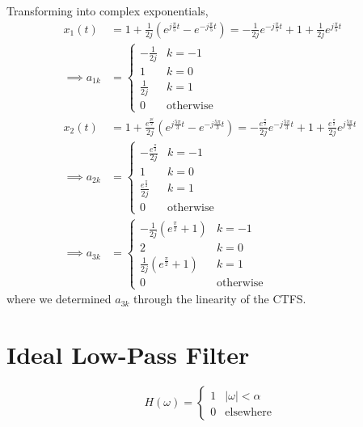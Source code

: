 \documentclass{article}
\begin{document}
Transforming into complex exponentials,
\begin{align}
    x_1(t) &= 1 + \frac{1}{2j} (e^{j\frac{\pi}{5} t} - e^{-j\frac{\pi}{5} t}) = -\frac{1}{2j} e^{-j \frac{\pi}{5} t} + 1 + \frac{1}{2j} e^{j \frac{\pi}{5} t} \\
    \implies a_{1k} &=
    \begin{cases}
        -\frac{1}{2j} & k = -1 \\
        1 & k = 0 \\
        \frac{1}{2j} & k = 1 \\
        0 & \text{otherwise}
    \end{cases} \\
    x_2(t) &= 1 + \frac{e^{\frac{pi}{2}}}{2j} (e^{j \frac{5 \pi}{3} t} - e^{-j \frac{5 \pi}{3} t}) = -\frac{e^{\frac{\pi}{2}}}{2j} e^{-j \frac{5 \pi}{3} t} + 1 + \frac{e^{\frac{\pi}{2}}}{2j} e^{j \frac{5 \pi}{3} t} \\
    \implies a_{2k} &=
    \begin{cases}
        -\frac{e^{\frac{\pi}{2}}}{2j} & k = -1 \\
        1 & k = 0 \\
        \frac{e^{\frac{\pi}{2}}}{2j} & k = 1 \\
        0 & \text{otherwise}
    \end{cases} \\
    \implies a_{3k} &=
    \begin{cases}
        -\frac{1}{2j} (e^{\frac{\pi}{2}} + 1) & k = -1 \\
        2 & k = 0 \\
        \frac{1}{2j} (e^{\frac{\pi}{2}} + 1) & k = 1 \\
        0 & \text{otherwise}
    \end{cases}
\end{align}
where we determined \(a_{3k}\) through the linearity of the CTFS.

\section{Ideal Low-Pass Filter}

\begin{equation}
    H(\omega) =
    \begin{cases}
        1 & |\omega| < \alpha \\
        0 & \text{elsewhere}
    \end{cases}
\end{equation}
\end{document}
